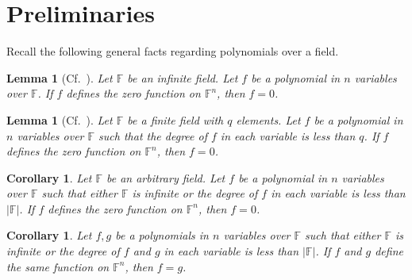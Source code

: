 \documentclass{elsarticle}
\def\F{{\mathbb F}}
\newtheorem{lemma}[theorem]{Lemma}
\newtheorem{corollary}[theorem]{Corollary}
\theoremstyle{definition}
\numberwithin{equation}{section}
\begin{document}


\section{Preliminaries}
\label{sec:prelim}

Recall the following general facts regarding polynomials over a field. 


\begin{lemma}[{Cf.~\cite[IV, \S 1, Corollary 1.7.]{Lang2002}}]Let $\F$ be an infinite field. Let $f$ be a
polynomial in $n$ variables over $\F$. If $f$ defines the zero function on $\F^{n}$, then $f = 0$.
\end{lemma}

\begin{lemma}[{Cf.~\cite[IV, \S 1, Corollary 1.8]{Lang2002}}]Let $\F$ be a finite field with $q$ elements. Let $f$ be a
polynomial in $n$ variables over $\F$ such that the degree of $f$ in each variable
is less than $q$. If $f$ defines the zero function on $\F^{n}$, then $f = 0$.
\end{lemma}



\begin{corollary}\label{DegFLessZero}Let $\F$ be an arbitrary field. Let $f$ be a
polynomial in $n$ variables over $\F$ such that either $\F$ is infinite or the degree of $f$ in each variable
is less than $|\F|$. If $f$ defines the zero function on $\F^{n}$, then $f = 0$.
\end{corollary}


\begin{corollary}\label{DegFGLessEqual}Let $f, g$ be a
polynomials in $n$ variables over $\F$ such that either $\F$ is infinite or the degree of $f$ and $g$ in each variable
is less than $|\F|$. If $f$ and $g$ define the same function on $\F^{n}$, then $f = g$.
\end{corollary}
\end{document}
